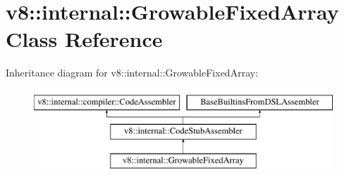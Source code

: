 \hypertarget{classv8_1_1internal_1_1GrowableFixedArray}{}\section{v8\+:\+:internal\+:\+:Growable\+Fixed\+Array Class Reference}
\label{classv8_1_1internal_1_1GrowableFixedArray}
Inheritance diagram for v8\+:\+:internal\+:\+:Growable\+Fixed\+Array\+:\begin{figure}[H]
\begin{center}
\leavevmode
\includegraphics[height=3.000000cm]{classv8_1_1internal_1_1GrowableFixedArray}
\end{center}
\end{figure}
